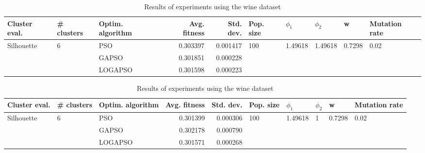 \documentclass{article}
\begin{document}
\begin{table}
\centering
\caption{Results of experiments using the wine dataset}
\begin{tabular}{lllrrlllll}
\toprule
              Cluster eval. &        \# clusters & Optim. algorithm &  Avg. fitness &  Std. dev. &            Pop. size &               $\phi_{1}$ &               $\phi_{2}$ &                       w &         Mutation rate \\
\midrule
\multirow{3}{*}{Silhouette} & \multirow{3}{*}{6} &              PSO &      0.303397 &   0.001417 & \multirow{3}{*}{100} & \multirow{3}{*}{1.49618} & \multirow{3}{*}{1.49618} & \multirow{3}{*}{0.7298} & \multirow{3}{*}{0.02} \\
                            &                    &            GAPSO &      0.301851 &   0.000228 &                      &                          &                          &                         &                       \\
                            &                    &          LOGAPSO &      0.301598 &   0.000223 &                      &                          &                          &                         &                       \\
\bottomrule
\end{tabular}
\end{table}
\begin{table}
\centering
\caption{Results of experiments using the wine dataset}
\begin{tabular}{lllrrlllll}
\toprule
              Cluster eval. &        \# clusters & Optim. algorithm &  Avg. fitness &  Std. dev. &            Pop. size &               $\phi_{1}$ &         $\phi_{2}$ &                       w &         Mutation rate \\
\midrule
\multirow{3}{*}{Silhouette} & \multirow{3}{*}{6} &              PSO &      0.301399 &   0.000306 & \multirow{3}{*}{100} & \multirow{3}{*}{1.49618} & \multirow{3}{*}{1} & \multirow{3}{*}{0.7298} & \multirow{3}{*}{0.02} \\
                            &                    &            GAPSO &      0.302178 &   0.000790 &                      &                          &                    &                         &                       \\
                            &                    &          LOGAPSO &      0.301571 &   0.000268 &                      &                          &                    &                         &                       \\
\bottomrule
\end{tabular}
\end{table}
\end{document}
